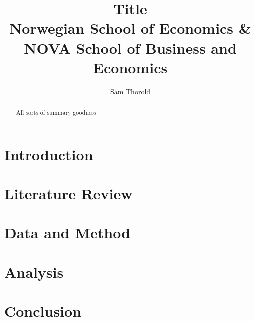 \documentclass[12pt]{article}
\title{Title \\
  \large Norwegian School of Economics \&
  NOVA School of Business and Economics}
\author{Sam Thorold}
\begin{document}
\maketitle
\begin{abstract}
All sorts of summary goodness
\end{abstract}

\pagebreak

\tableofcontents
\pagebreak

\section{Introduction} \label{sec:Intro}


\section{Literature Review} \label{sec:LitRev}


\section{Data and Method} \label{sec:DataMethod}


\section{Analysis} \label{sec:Analysis}


\section{Conclusion} \label{sec:Conclusion}


\pagebreak

\printbibliography
\end{document}
